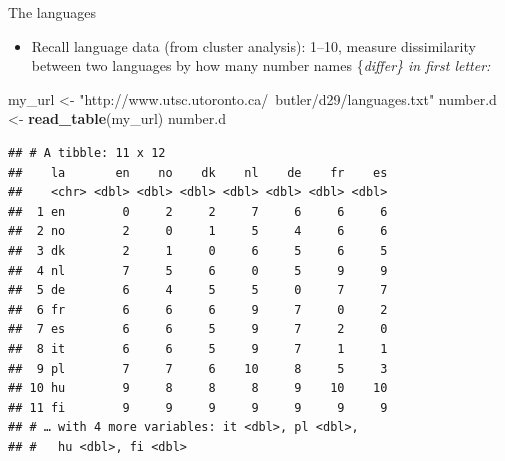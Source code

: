 \documentclass[ignorenonframetext,]{beamer}
\newenvironment{Shaded}{\begin{snugshade}}{\end{snugshade}}
\newcommand{\KeywordTok}[1]{\textcolor[rgb]{0.13,0.29,0.53}{\textbf{#1}}}
\newcommand{\NormalTok}[1]{#1}
\newcommand{\StringTok}[1]{\textcolor[rgb]{0.31,0.60,0.02}{#1}}
\providecommand{\tightlist}{%
  \setlength{\itemsep}{0pt}\setlength{\parskip}{0pt}}
\begin{document}
\begin{frame}[fragile]{The languages}
\protect\hypertarget{the-languages}{}

\begin{itemize}
\tightlist
\item
  Recall language data (from cluster analysis): 1--10, measure
  dissimilarity between two languages by how many number names
  \{\em differ\} in first letter:
\end{itemize}

\begin{Shaded}
\begin{Highlighting}[]
\NormalTok{my_url <-}\StringTok{ "http://www.utsc.utoronto.ca/~butler/d29/languages.txt"}
\NormalTok{number.d <-}\StringTok{ }\KeywordTok{read_table}\NormalTok{(my_url)}
\NormalTok{number.d}
\end{Highlighting}
\end{Shaded}

\begin{verbatim}
## # A tibble: 11 x 12
##    la       en    no    dk    nl    de    fr    es
##    <chr> <dbl> <dbl> <dbl> <dbl> <dbl> <dbl> <dbl>
##  1 en        0     2     2     7     6     6     6
##  2 no        2     0     1     5     4     6     6
##  3 dk        2     1     0     6     5     6     5
##  4 nl        7     5     6     0     5     9     9
##  5 de        6     4     5     5     0     7     7
##  6 fr        6     6     6     9     7     0     2
##  7 es        6     6     5     9     7     2     0
##  8 it        6     6     5     9     7     1     1
##  9 pl        7     7     6    10     8     5     3
## 10 hu        9     8     8     8     9    10    10
## 11 fi        9     9     9     9     9     9     9
## # … with 4 more variables: it <dbl>, pl <dbl>,
## #   hu <dbl>, fi <dbl>
\end{verbatim}

\end{frame}
\end{document}
